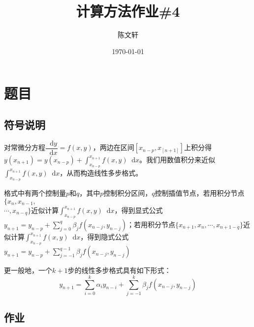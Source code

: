 \documentclass[cn,hazy,green,11pt,normal]{elegantnote}
\title{计算方法作业\#4}
\author{陈文轩}
\institute{KFRC}
\date{\today}
\newcommand*{\diff}{\mathop{}\!\mathrm{d}}
\begin{document}
\maketitle


\section{题目}

    \subsection{符号说明}

        对常微分方程$\dfrac{\diff y}{\diff x}=f(x,y)$，两边在区间$[x_{n-p},x_[n+1]]$上积分得$y(x_{n+1})=y(x_{n-p})+\int_{x_{n-p}}^{x_{n+1}}f(x,y)\diff x$。我们用数值积分来近似$\int_{x_{n-p}}^{x_{n+1}}f(x,y)\diff x$，从而构造线性多步格式。

        格式中有两个控制量$p$和$q$，其中$p$控制积分区间，$q$控制插值节点，若用积分节点$\{x_n,x_{n-1},$\\$\cdots,x_{n-q}\}$近似计算$\int_ {x_{n-p}}^{x_{n+1}}f(x,y)\diff x$，得到显式公式$y_{n+1}=y_{n-p}+\sum_{j=0}^q \beta_j f(x_{n-j},y_{n-j})$；若用积分节点$\{x_{n+1},x_n,\cdots,x_{n+1-q}\}$近似计算$\int_{x_{n-p}}^{x_{n+1}}f(x,y)\diff x$，得到隐式公式 $y_{n+1}=y_{n-p}+\sum_{j=-1}^{q-1} \beta_j f(x_{n-j},y_{n-j})$

        更一般地，一个$k+1$步的线性多步格式具有如下形式：
        \[y_{n+1}=\sum_{i=0}^k \alpha_i y_{n-i}+\sum_{j=-1}^k \beta_j f(x_{n-j},y_{n-j})\]

    \subsection{作业}
\end{document}
